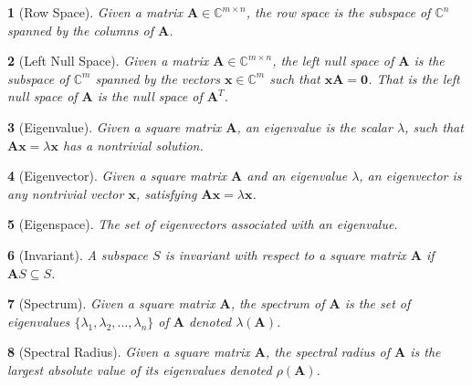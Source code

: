 \documentclass{article}
\theoremstyle{bolddef}
\newtheorem*{definition}{}
\begin{document}
\begin{definition}[Row Space]
    Given a matrix $\mathbf{A} \in \mathbb{C}^{m \times n}$, the row space is the
    subspace of $\mathbb{C}^{n}$ spanned by the columns of $\mathbf{A}$.
\end{definition}

\begin{definition}[Left Null Space]
    Given a matrix $\mathbf{A} \in \mathbb{C}^{m \times n}$, the left null space of 
    $\mathbf{A}$ is the subspace of $\mathbb{C}^{m}$ spanned by the vectors $\mathbf{x} \in \mathbb{C}^{m}$
    such that $\mathbf{x} \mathbf{A} = \mathbf{0}$. That is the left null space of $\mathbf{A}$ is the null space
    of $\mathbf{A}^{T}$.
\end{definition}

\begin{definition}[Eigenvalue]
    Given a square matrix $\mathbf{A}$, an eigenvalue is the scalar $\lambda$, such that $\mathbf{A} \mathbf{x}= \lambda \mathbf{x}$
    has a nontrivial solution.
\end{definition}

\begin{definition}[Eigenvector]
    Given a square matrix $\mathbf{A}$ and an eigenvalue $\lambda$, an eigenvector is any nontrivial vector $\mathbf{x}$, satisfying
    $\mathbf{A} \mathbf{x}= \lambda \mathbf{x}$.
\end{definition}

\begin{definition}[Eigenspace]
    The set of eigenvectors associated with an eigenvalue.
\end{definition}

\begin{definition}[Invariant]
    A subspace $\mathit{S}$ is invariant with respect to a square matrix $\mathbf{A}$
    if $\mathbf{A}\mathit{S} \subseteq \mathit{S}$.
\end{definition}

\begin{definition}[Spectrum]
    Given a square matrix $\mathbf{A}$, the spectrum of $\mathbf{A}$ is the set of eigenvalues $\{\lambda_1, \lambda_2, \ldots, \lambda_n\}$
    of $\mathbf{A}$ denoted $\lambda(\mathbf{A})$.
\end{definition}

\begin{definition}[Spectral Radius]
    Given a square matrix $\mathbf{A}$, the spectral radius of $\mathbf{A}$ is the largest
    absolute value of its eigenvalues denoted $\rho(\mathbf{A})$.
\end{definition}
\end{document}
